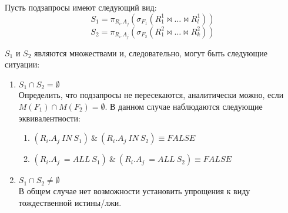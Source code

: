 \documentclass{cmi}
\def \n #1{\mathit{#1}}
\begin{document}
Пусть подзапросы имеют следующий вид:
$$S_1 = \pi_{R_i.A_j} (\sigma_{F_1} (R_1^1 \Join \dots \Join R_l^1))$$
$$S_2 = \pi_{R_i.A_j} (\sigma_{F_2} (R_1^2 \Join \dots \Join R_k^2))$$

$S_1$ и $S_2$ являются множествами и, следовательно, могут быть следующие ситуации:
\begin{enumerate}
	\item $S_1 \cap S_2 = \emptyset $\\
	Определить, что подзапросы не пересекаются, аналитически можно, если $M(F_1) \cap M(F_2) =
	\emptyset$. В данном случае наблюдаются следующие эквивалентности:
	\begin{enumerate}
		\item $(\n{R_i.A_j}\ \n{IN}\ S_1)\ \&\ (\n{R_i.A_j}\ \n{IN}\ S_2) \equiv \n{FALSE}$
		\item $(\n{R_i.A_j}\ = \n{ALL}\ S_1)\ \&\ (\n{R_i.A_j}\ = \n{ALL}\ S_2) \equiv \n{FALSE}$
	\end{enumerate}
	\item $S_1 \cap S_2 \neq \emptyset $\\
	В общем случае нет возможности установить упрощения к виду тождественной истины/лжи.
\end{enumerate}
\end{document}
